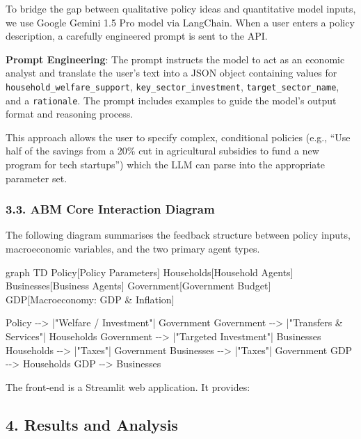 \documentclass[
]{article}
\newenvironment{Shaded}{}{}
\newcommand{\NormalTok}[1]{#1}
\begin{document}
To bridge the gap between qualitative policy ideas and quantitative
model inputs, we use Google Gemini 1.5 Pro model via LangChain. When a
user enters a policy description, a carefully engineered prompt is sent
to the API.

\textbf{Prompt Engineering}: The prompt instructs the model to act as an
economic analyst and translate the user's text into a JSON object
containing values for \texttt{household\_welfare\_support},
\texttt{key\_sector\_investment}, \texttt{target\_sector\_name}, and a
\texttt{rationale}. The prompt includes examples to guide the model's
output format and reasoning process.

This approach allows the user to specify complex, conditional policies
(e.g., ``Use half of the savings from a 20\% cut in agricultural
subsidies to fund a new program for tech startups'') which the LLM can
parse into the appropriate parameter set.

\subsubsection{3.3. ABM Core Interaction
Diagram}\label{abm-core-interaction-diagram}

The following diagram summarises the feedback structure between policy
inputs, macroeconomic variables, and the two primary agent types.

\begin{Shaded}
\begin{Highlighting}[]
\NormalTok{graph TD}
\NormalTok{    Policy[Policy Parameters]}
\NormalTok{    Households[Household Agents]}
\NormalTok{    Businesses[Business Agents]}
\NormalTok{    Government[Government Budget]}
\NormalTok{    GDP[Macroeconomy: GDP \& Inflation]}

\NormalTok{    Policy {-}{-}\textgreater{} |"Welfare / Investment"| Government}
\NormalTok{    Government {-}{-}\textgreater{} |"Transfers \& Services"| Households}
\NormalTok{    Government {-}{-}\textgreater{} |"Targeted Investment"| Businesses}
\NormalTok{    Households {-}{-}\textgreater{} |"Taxes"| Government}
\NormalTok{    Businesses {-}{-}\textgreater{} |"Taxes"| Government}
\NormalTok{    GDP {-}{-}\textgreater{} Households}
\NormalTok{    GDP {-}{-}\textgreater{} Businesses}
\end{Highlighting}
\end{Shaded}

The front-end is a Streamlit web application. It provides:

\subsection{4. Results and Analysis}\label{results-and-analysis}
\end{document}
